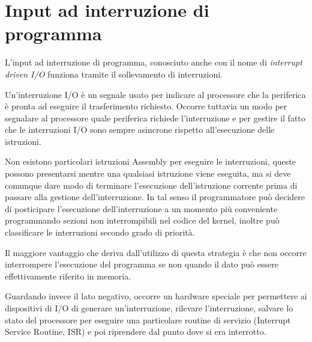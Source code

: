 \documentclass[class=book, crop=false, oneside]{standalone}
\begin{document}
\section{Input ad interruzione di programma}
L'input ad interruzione di programma, conosciuto anche con il nome di \emph{interrupt driven I/O} funziona tramite il sollevamento di interruzioni.

Un'interruzione I/O è un segnale usato per indicare al processore che la periferica è pronta ad eseguire il trasferimento richiesto.
Occorre tuttavia un modo per segnalare al processore quale periferica richiede l'interruzione e per gestire il fatto che le interruzioni I/O sono sempre asincrone rispetto all'esecuzione delle istruzioni.

Non esistono particolari istruzioni Assembly per eseguire le interruzioni, queste possono presentarsi mentre una qualsiasi istruzione viene eseguita, ma si deve comunque dare modo di terminare l'esecuzione dell'istruzione corrente prima di passare alla gestione dell'interruzione. In tal senso il programmatore può decidere di posticipare l'esecuzione dell'interruzione a un momento più conveniente programmando sezioni non interrompibili nel codice del kernel, inoltre può classificare le interruzioni secondo grado di priorità.

Il maggiore vantaggio che deriva dall'utilizzo di questa strategia è che non occorre interrompere l'esecuzione del programma se non quando il dato può essere effettivamente riferito in memoria.

Guardando invece il lato negativo, occorre un hardware speciale per permettere ai dispositivi di I/O di generare un'interruzione, rilevare l'interruzione, salvare lo stato del processore per eseguire una particolare routine di servizio (Interrupt Service Routine, ISR) e poi riprendere dal punto dove si era interrotto.
\end{document}
